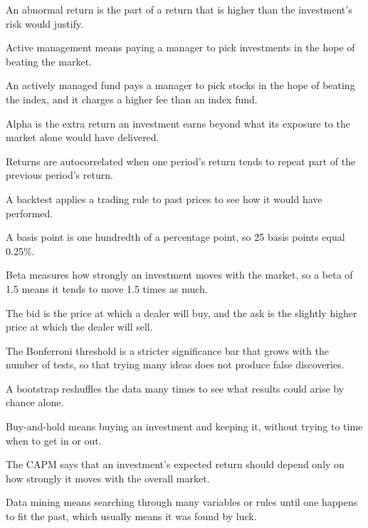\begin{keyterms}
\footnotesize
\begin{description}[leftmargin=0pt, itemsep=0pt, parsep=0pt, topsep=0pt, font=\normalfont\bfseries\color{FEMaroon}]
  \item[Abnormal return.] An abnormal return is the part of a return that is higher than the investment's risk would justify.
  \item[Active management.] Active management means paying a manager to pick investments in the hope of beating the market.
  \item[Actively managed fund.] An actively managed fund pays a manager to pick stocks in the hope of beating the index, and it charges a higher fee than an index fund.
  \item[Alpha.] Alpha is the extra return an investment earns beyond what its exposure to the market alone would have delivered.
  \item[Autocorrelated returns.] Returns are autocorrelated when one period's return tends to repeat part of the previous period's return.
  \item[Backtest.] A backtest applies a trading rule to past prices to see how it would have performed.
  \item[Basis point.] A basis point is one hundredth of a percentage point, so 25 basis points equal 0.25\%.
  \item[Beta.] Beta measures how strongly an investment moves with the market, so a beta of 1.5 means it tends to move 1.5 times as much.
  \item[Bid and ask prices.] The bid is the price at which a dealer will buy, and the ask is the slightly higher price at which the dealer will sell.
  \item[Bonferroni threshold.] The Bonferroni threshold is a stricter significance bar that grows with the number of tests, so that trying many ideas does not produce false discoveries.
  \item[Bootstrap.] A bootstrap reshuffles the data many times to see what results could arise by chance alone.
  \item[Buy-and-hold.] Buy-and-hold means buying an investment and keeping it, without trying to time when to get in or out.
  \item[Capital Asset Pricing Model (CAPM).] The CAPM says that an investment's expected return should depend only on how strongly it moves with the overall market.
  \item[Data mining.] Data mining means searching through many variables or rules until one happens to fit the past, which usually means it was found by luck.

\end{description}
\end{keyterms}
